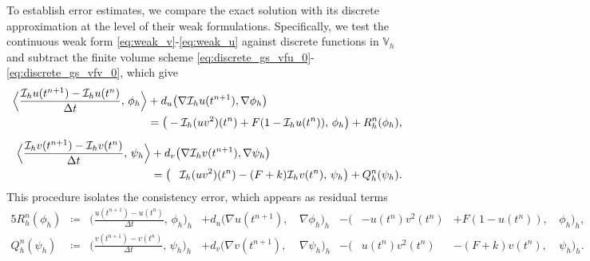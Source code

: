 \documentclass[11pt, a4paper]{amsart}
\newcommand{\la}{\langle}
\newcommand{\ra}{\rangle}
\newcommand{\VV}{\mathbb{V}}
\newcommand{\mI}{\mathcal{I}}
\numberwithin{equation}{section}
\begin{document}
	To establish error estimates, we compare the exact solution with its discrete approximation at the level of their weak formulations. Specifically, we test the continuous weak form \eqref{eq:weak_v}-\eqref{eq:weak_u} against discrete functions in $\VV_h$ and subtract the finite volume scheme \eqref{eq:discrete_gs_vfu_0}-\eqref{eq:discrete_gs_vfv_0}, which give
	\begin{align*}
		\begin{split}
			\Big\la   \frac{\mI_h u(t^{n+1}) -  \mI_h u(t^{n})}{\Delta t}, \, \phi_h \Big\ra &+  d_u \big(\nabla \mI_h u(t^{n+1}), \nabla \phi_h \big)
			\\ 
			&=   \big(-\mI_h (uv^2)(t^{n}) + F(1 - \mI_h u(t^{n})),\, \phi_h\big) + R_h^n(\phi_h),
		\end{split}  
		\\[5pt]
		\begin{split}
			\Big\la   \frac{\mI_h v(t^{n+1}) - \mI_h v(t^{n})}{\Delta t},\, \psi_h \Big\ra &+  d_v  \big(\nabla \mI_h v(t^{n+1}), \nabla \psi_h\big) 
			\\
			&=   \big(\hphantom{-}\mI_h(uv^2)(t^{n}) - (F + k)\mI_h v(t^{n}),\, \psi_h\big) + Q_h^n(\psi_h).
		\end{split}
	\end{align*} 
	This procedure isolates the consistency error, which appears as residual terms 
	\begin{alignat*}{5}
		R_h^n(\phi_h) &\coloneqq& \Big( \frac{u(t^{n+1}) - u(t^n)}{\Delta t},\, \phi_h \Big)_h 
		&+ d_u \big( \nabla u(t^{n+1}),\, &\nabla \phi_h \big)_h 
		&-  \big( &-u(t^n)v^2(t^n) &+ F(1 - u(t^n)),\, &\phi_h \big )_h, 
		\\
		Q_h^n(\psi_h) &\coloneqq &\Big( \frac{v(t^{n+1}) - v(t^n)}{\Delta t},\, \psi_h \Big)_h 
		&+ d_v \big( \nabla v(t^{n+1}),\, &\nabla \psi_h \big)_h 
		&-  \big(&u(t^n)v^2(t^n) &- (F + k)v(t^n),\, &\psi_h  \big)_h.
	\end{alignat*} 
		
\end{document}
